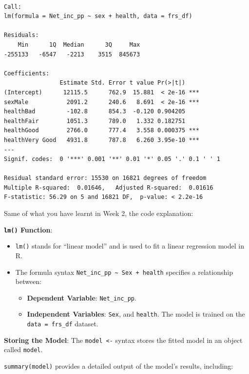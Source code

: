 \documentclass[
  letterpaper,
  DIV=11,
  numbers=noendperiod]{scrreprt}
\providecommand{\tightlist}{%
  \setlength{\itemsep}{0pt}\setlength{\parskip}{0pt}}\usepackage{longtable,booktabs,array}
\begin{document}
\begin{verbatim}

Call:
lm(formula = Net_inc_pp ~ sex + health, data = frs_df)

Residuals:
    Min      1Q  Median      3Q     Max 
-255133   -6547   -2213    3515  845673 

Coefficients:
                Estimate Std. Error t value Pr(>|t|)    
(Intercept)      12115.5      762.9  15.881  < 2e-16 ***
sexMale           2091.2      240.6   8.691  < 2e-16 ***
healthBad         -102.8      854.3  -0.120 0.904205    
healthFair        1051.3      789.0   1.332 0.182751    
healthGood        2766.0      777.4   3.558 0.000375 ***
healthVery Good   4931.8      787.8   6.260 3.95e-10 ***
---
Signif. codes:  0 '***' 0.001 '**' 0.01 '*' 0.05 '.' 0.1 ' ' 1

Residual standard error: 15530 on 16821 degrees of freedom
Multiple R-squared:  0.01646,   Adjusted R-squared:  0.01616 
F-statistic: 56.29 on 5 and 16821 DF,  p-value: < 2.2e-16
\end{verbatim}

Same of what you have learnt in Week 2, the code explanation:

\textbf{\texttt{lm()} Function}:

\begin{itemize}
\tightlist
\item
  \texttt{lm()} stands for ``linear model'' and is used to fit a linear
  regression model in R.
\item
  The formula syntax
  \texttt{Net\_inc\_pp\ \textasciitilde{}\ Sex\ +\ health} specifies a
  relationship between:

  \begin{itemize}
  \tightlist
  \item
    \textbf{Dependent Variable}: \texttt{Net\_inc\_pp}.
  \item
    \textbf{Independent Variables}: \texttt{Sex}, and \texttt{health}.
    The model is trained on the \texttt{data\ =\ frs\_df} dataset.
  \end{itemize}
\end{itemize}

\textbf{Storing the Model}: The \texttt{model\ \textless{}-} syntax
stores the fitted model in an object called \texttt{model}.

\texttt{summary(model)} provides a detailed output of the model's
results, including:
\end{document}
